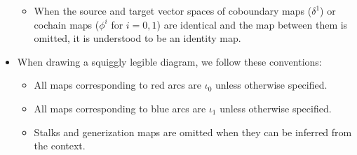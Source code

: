 \begin{itemize}[label={--}]
\begin{itemize}[label = $\circ$]
\item When the source and target vector spaces of coboundary maps ($\delta^1$) or cochain maps ($\phi^i$ for $i=0,1$) are identical and the map between them is omitted, it is understood to be an identity map.

\end{itemize}
\item When drawing a squiggly legible diagram, we follow these conventions:
\begin{itemize}[label=$\circ$]
\item All maps corresponding to red arcs are $\iota_0$ unless otherwise specified.
  
\item All maps corresponding to blue arcs are $\iota_1$ unless otherwise specified.
  
\item Stalks and generization maps are omitted when they can be inferred from the context.
\end{itemize}
\end{itemize}